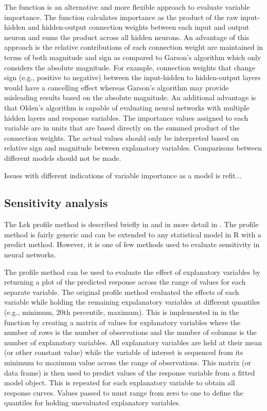 \documentclass[article]{jss}\usepackage[]{graphicx}\usepackage[]{color}
\begin{document}
The  function is an alternative and more flexible approach to evaluate variable importance. The function calculates importance as the product of the raw input-hidden and hidden-output connection weights between each input and output neuron and sums the product across all hidden neurons. An advantage of this approach is the relative contributions of each connection weight are maintained in terms of both magnitude and sign as compared to Garson's algorithm which only considers the absolute magnitude. For example, connection weights that change sign (e.g., positive to negative) between the input-hidden to hidden-output layers would have a cancelling effect whereas Garson's algorithm may provide misleading results based on the absolute magnitude. An additional advantage is that Olden's algorithm is capable of evaluating neural networks with multiple hidden layers and response variables. The importance values assigned to each variable are in units that are based directly on the summed product of the connection weights. The actual values should only be interpreted based on relative sign and magnitude between explanatory variables. Comparisons between different models should not be made.

Issues with different indications of variable importance as a model is refit...

\subsection{Sensitivity analysis}

The Lek profile method is described briefly in \citet{Lek96} and in more detail in \citet{Gevrey03}. The profile method is fairly generic and can be extended to any statistical model in R with a predict method. However, it is one of few methods used to evaluate sensitivity in neural networks.

The profile method can be used to evaluate the effect of explanatory variables by returning a plot of the predicted response across the range of values for each separate variable. The original profile method evaluated the effects of each variable while holding the remaining expalanatory variables at different quantiles (e.g., minimum, 20th percentile, maximum). This is implemented in in the function by creating a matrix of values for explanatory variables where the number of rows is the number of observations and the number of columns is the number of explanatory variables. All explanatory variables are held at their mean (or other constant value) while the variable of interest is sequenced from its minimum to maximum value across the range of observations. This matrix (or data frame) is then used to predict values of the response variable from a fitted model object. This is repeated for each explanatory variable to obtain all response curves. Values passed to  must range from zero to one to define the quantiles for holding unevaluated explanatory variables.
\end{document}
